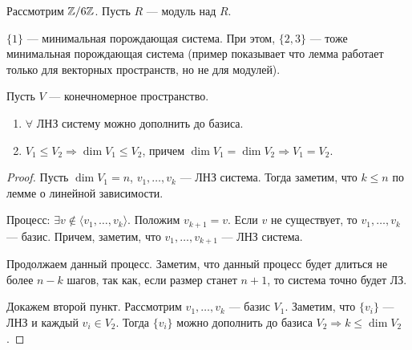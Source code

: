 \begin{example}
    Рассмотрим $\mathbb{Z} / 6 \mathbb{Z}$. Пусть  $R$ --- модуль над  $R$. 

    $\{1\}$ --- минимальная порождающая система. При этом,  $\{2, 3\}$ --- тоже минимальная порождающая система (пример показывает что лемма работает только для векторных пространств, но не для модулей).
\end{example}
\begin{lemma}
    Пусть $V$ --- конечномерное пространство.
    \begin{enumerate}
        \item $\forall $ ЛНЗ систему можно дополнить до базиса.
        \item $V_1 \le V_2 \Rightarrow \dim V_1 \le V_2$, причем $\dim V_1 = \dim V_2 \Rightarrow V_1 = V_2$.
    \end{enumerate}
\end{lemma}
\begin{proof}
   Пусть $\dim V_1 = n$, $v_1, \ldots, v_k$ --- ЛНЗ система. Тогда заметим, что $k \le n$ по лемме о линейной зависимости.

   Процесс: $\exists v \notin \langle v_1, \ldots, v_k \rangle$. Положим $v_{k+1} = v$. Если  $v$ не существует, то  $v_1, \ldots, v_k$ --- базис. Причем, заметим, что $v_1, \ldots, v_{k+1}$ --- ЛНЗ система. 

   Продолжаем данный процесс. Заметим, что данный процесс будет длиться не более $n-k$ шагов, так как, если размер станет  $n + 1$, то система точно будет ЛЗ.


   Докажем второй пункт. Рассмотрим  $v_1, \ldots, v_k$ --- базис $V_1$. Заметим, что $\{v_i\}$ --- ЛНЗ и каждый  $v_i \in V_2$. Тогда $\{v_i\}$ можно дополнить до базиса  $V_2 \Rightarrow k \le \dim V_2$.
\end{proof}

